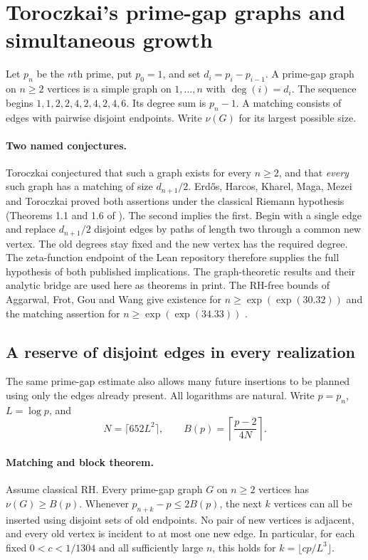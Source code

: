 \section{Toroczkai's prime-gap graphs and simultaneous growth}
\label{sec:primegapgraphs}
Let $p_n$ be the $n$th prime, put $p_0=1$, and set $d_i=p_i-p_{i-1}$.
A prime-gap graph on $n\ge2$ vertices is a simple graph on $1,\ldots,n$
with $\deg(i)=d_i$. The sequence begins $1,1,2,2,4,2,4,2,4,6$.
Its degree sum is $p_n-1$. A matching consists of edges with pairwise
disjoint endpoints. Write $\nu(G)$ for its largest possible size.

\paragraph{Two named conjectures.}
Toroczkai conjectured that such a graph exists for every $n\ge2$, and
that \emph{every} such graph has a matching of size $d_{n+1}/2$.
Erd\H{o}s, Harcos, Kharel, Maga, Mezei and Toroczkai
proved both assertions under the classical Riemann hypothesis
(Theorems 1.1 and 1.6 of \cite{graphEH}).
The second implies the first. Begin with a single edge and replace
$d_{n+1}/2$ disjoint edges by paths of length two through a common new vertex.
The old degrees stay fixed and the new vertex has the required degree.
The zeta-function endpoint of the Lean repository therefore supplies the full
hypothesis of both published implications. The graph-theoretic results and
their analytic bridge are used here as theorems in print.
The RH-free bounds of Aggarwal, Frot, Gou and Wang
give existence for $n\ge\exp(\exp(30.32))$ and the matching assertion for
$n\ge\exp(\exp(34.33))$ \cite{graphAF}.

\subsection{A reserve of disjoint edges in every realization}
The same prime-gap estimate also allows many future insertions to be planned
using only the edges already present. All logarithms are natural.
Write $p=p_n$, $L=\log p$, and
\[
       N=\lceil652L^2\rceil,\qquad
       B(p)=\left\lceil\frac{p-2}{4N}\right\rceil .
\]
\paragraph{Matching and block theorem.}
Assume classical RH. Every prime-gap graph $G$ on $n\ge2$ vertices has
$\nu(G)\ge B(p)$. Whenever $p_{n+k}-p\le2B(p)$, the next $k$ vertices
can all be inserted using disjoint sets of old endpoints. No pair of new
vertices is adjacent, and every old vertex is incident to at most one
new edge. In particular, for each fixed $0<c<1/1304$ and all sufficiently
large $n$, this holds for $k=\lfloor c p/L^3\rfloor$.

